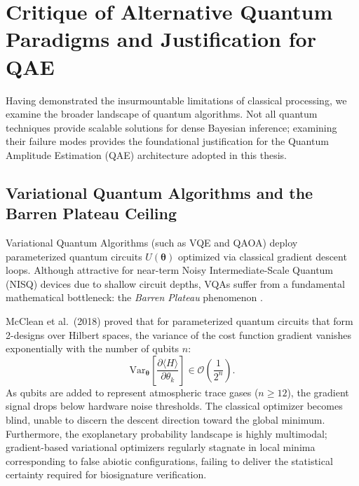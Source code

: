 \section{Critique of Alternative Quantum Paradigms and Justification for QAE}\label{sec:critique_quantum_alternatives}

Having demonstrated the insurmountable limitations of classical processing, we examine the broader landscape of quantum algorithms. Not all quantum techniques provide scalable solutions for dense Bayesian inference; examining their failure modes provides the foundational justification for the Quantum Amplitude Estimation (QAE) architecture adopted in this thesis.

\subsection{Variational Quantum Algorithms and the Barren Plateau Ceiling}
Variational Quantum Algorithms (such as VQE and QAOA) deploy parameterized quantum circuits $U(\boldsymbol{\theta})$ optimized via classical gradient descent loops. Although attractive for near-term Noisy Intermediate-Scale Quantum (NISQ) devices due to shallow circuit depths, VQAs suffer from a fundamental mathematical bottleneck: the \emph{Barren Plateau} phenomenon \cite{mcclean2018}.

McClean et al.~(2018) proved that for parameterized quantum circuits that form 2-designs over Hilbert spaces, the variance of the cost function gradient vanishes exponentially with the number of qubits $n$:
\begin{equation}
\mathrm{Var}_{\boldsymbol{\theta}}\left[ \frac{\partial \langle H \rangle}{\partial \theta_k} \right] \in \mathcal{O}\left( \frac{1}{2^n} \right).
\label{eq:barren_plateau_variance_decay}
\end{equation}
As qubits are added to represent atmospheric trace gases ($n \ge 12$), the gradient signal drops below hardware noise thresholds. The classical optimizer becomes blind, unable to discern the descent direction toward the global minimum. Furthermore, the exoplanetary probability landscape is highly multimodal; gradient-based variational optimizers regularly stagnate in local minima corresponding to false abiotic configurations, failing to deliver the statistical certainty required for biosignature verification.

